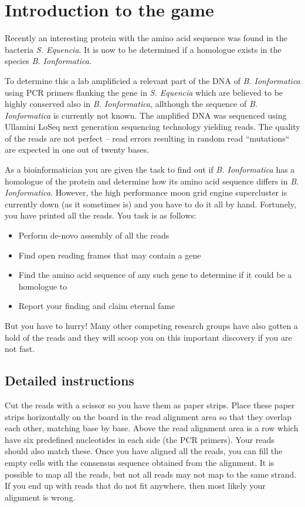 \section*{Introduction to the game}

Recently an interesting protein with the amino acid sequence \mutantprotein{ }was found in the bacteria \emph{S. Equencia}. 
It is now to be determined if a homologue exists in the species \emph{B. Ionformatica}.

To determine this a lab amplificied a relevant part of the DNA of \emph{B. Ionformatica} using PCR primers flanking
the gene in \emph{S. Equencia} which are believed to be highly conserved also in \emph{B. Ionformatica}, allthough
the sequence of \emph{B. Ionformatica} is currently not known.
The amplified DNA was sequenced using Ullamini LoSeq next generation sequencing technology yielding \numberofreads{ } reads.
The quality of the reads are not perfect -- read errors resulting in random read ``mutations`` are expected in one out of twenty bases. 

As a bioinformatician you are given the task to find out if \emph{B. Ionformatica} has a homologue of the protein \mutantprotein{ } and 
determine how its amino acid sequence differs in \emph{B. Ionformatica}.
However, the high performance moon grid engine supercluster is currently down (as it sometimes is) and you have to do it all by hand. 
Fortunely, you have printed all the reads. 
You task is as follows:

\begin{itemize} 
\item Perform de-novo assembly of all the reads
\item Find open reading frames that may contain a gene
\item Find the amino acid sequence of any such gene to determine if it could be a homologue to \mutantprotein{ }
\item Report your finding and claim eternal fame 
\end{itemize}

But you have to hurry! Many other competing research groups have also gotten a hold of the reads and 
they will scoop you on this important discovery if you are not fast. 

\subsection*{Detailed instructions}

Cut the reads with a scissor so you have them as paper strips. 
Place these paper strips horizontally on the board in the read alignment area so that they overlap each other, matching base by base. 
Above the read alignment area is a row which have six predefined nucleotides in each side (the PCR primers). 
Your reads should also match these.  
Once you have aligned all the reads, you can fill the empty cells with the consensus sequence obtained from the alignment. 
It is possible to map all the reads, but not all reads may not map to the same strand. 
If you end up with reads that do not fit anywhere, then most likely your alignment is wrong. 

